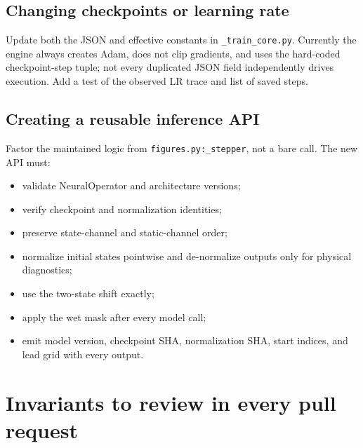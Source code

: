 \documentclass[11pt,oneside]{report}
\newcommand{\repo}[1]{\nolinkurl{#1}}
\newcommand{\code}[1]{\texttt{\detokenize{#1}}}
\begin{document}
\subsection{Changing checkpoints or learning rate}

Update both the JSON and effective constants in \repo{_train_core.py}.
Currently the engine always creates Adam, does not clip gradients, and uses the
hard-coded checkpoint-step tuple; not every duplicated JSON field independently
drives execution. Add a test of the observed LR trace and list of saved steps.

\subsection{Creating a reusable inference API}

Factor the maintained logic from \repo{figures.py:_stepper}, not a bare
\code{model(features)} call. The new API must:
\begin{itemize}
  \item validate NeuralOperator and architecture versions;
  \item verify checkpoint and normalization identities;
  \item preserve state-channel and static-channel order;
  \item normalize initial states pointwise and de-normalize outputs only for
        physical diagnostics;
  \item use the two-state shift exactly;
  \item apply the wet mask after every model call;
  \item emit model version, checkpoint SHA, normalization SHA, start indices,
        and lead grid with every output.
\end{itemize}

\section{Invariants to review in every pull request}
\end{document}
